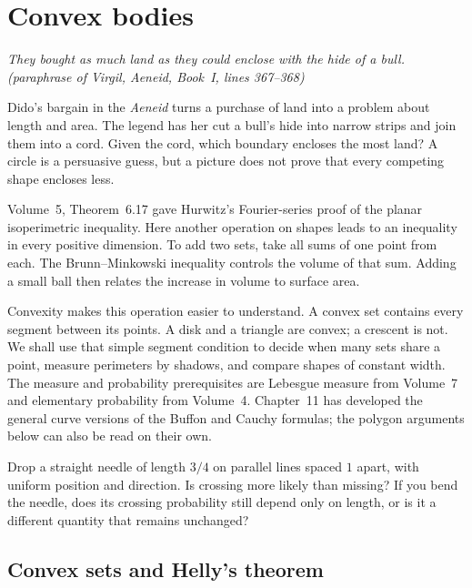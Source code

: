 \chapter{Convex bodies}\label{geometry:ch:convex}

\begin{center}\itshape
They bought as much land as they could enclose with the hide of a bull.
\upshape(paraphrase of Virgil, \emph{Aeneid}, Book~I, lines 367--368)
\end{center}

Dido's bargain in the \emph{Aeneid} turns a purchase of land into a problem about length and area. The legend has her cut a bull's hide into narrow strips and join them into a cord. Given the cord, which boundary encloses the most land? A circle is a persuasive guess, but a picture does not prove that every competing shape encloses less.

Volume~5, Theorem~6.17 gave Hurwitz's Fourier-series proof of the planar isoperimetric inequality. Here another operation on shapes leads to an inequality in every positive dimension. To add two sets, take all sums of one point from each. The Brunn--Minkowski inequality controls the volume of that sum. Adding a small ball then relates the increase in volume to surface area.

Convexity makes this operation easier to understand. A convex set contains every segment between its points. A disk and a triangle are convex; a crescent is not. We shall use that simple segment condition to decide when many sets share a point, measure perimeters by shadows, and compare shapes of constant width. The measure and probability prerequisites are Lebesgue measure from Volume~7 and elementary probability from Volume~4. Chapter~11 has developed the general curve versions of the Buffon and Cauchy formulas; the polygon arguments below can also be read on their own.

\begin{think}
Drop a straight needle of length $3/4$ on parallel lines spaced $1$ apart, with uniform position and direction. Is crossing more likely than missing? If you bend the needle, does its crossing probability still depend only on length, or is it a different quantity that remains unchanged?
\end{think}

\section{Convex sets and Helly's theorem}


